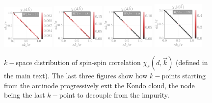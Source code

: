 \documentclass[reprint,hidelinks,onecolumn]{revtex4-2}
\begin{document}
\begin{figure}[htpb]
	\centering
	\includegraphics[width=0.23\textwidth]{SF-1.pdf}
	\includegraphics[width=0.23\textwidth]{SF-2.pdf}
	\includegraphics[width=0.23\textwidth]{SF-3.pdf}
	\includegraphics[width=0.23\textwidth]{SF-4.pdf}
	\caption{\(k-\)space distribution of spin-spin correlation \(\chi_s(d,\vec k)\) (defined in the main text). The last three figures show how \(k-\)points starting from the antinode progressively exit the Kondo cloud, the node being the last \(k-\)point to decouple from the impurity.}
	\label{spinCorr}
\end{figure}
\end{document}
